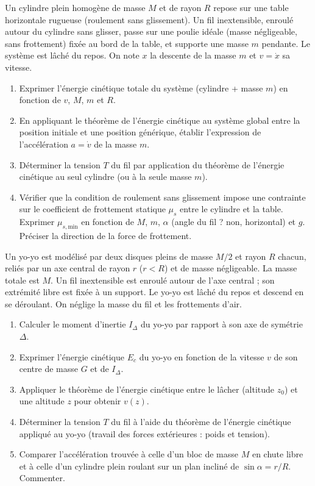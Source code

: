 \documentclass[11pt]{article}
\begin{document}
\begin{exercice}
Un cylindre plein homogène de masse $M$ et de rayon $R$ repose sur une table horizontale rugueuse (roulement sans glissement). Un fil inextensible, enroulé autour du cylindre sans glisser, passe sur une poulie idéale (masse négligeable, sans frottement) fixée au bord de la table, et supporte une masse $m$ pendante. Le système est lâché du repos. On note $x$ la descente de la masse $m$ et $v = \dot{x}$ sa vitesse.
\begin{enumerate}
    \item Exprimer l'énergie cinétique totale du système (cylindre + masse $m$) en fonction de $v$, $M$, $m$ et $R$.
    \item En appliquant le théorème de l'énergie cinétique au système global entre la position initiale et une position générique, établir l'expression de l'accélération $a = \dot{v}$ de la masse $m$.
    \item Déterminer la tension $T$ du fil par application du théorème de l'énergie cinétique au seul cylindre (ou à la seule masse $m$).
    \item Vérifier que la condition de roulement sans glissement impose une contrainte sur le coefficient de frottement statique $\mu_s$ entre le cylindre et la table. Exprimer $\mu_{s,\text{min}}$ en fonction de $M$, $m$, $\alpha$ (angle du fil ? non, horizontal) et $g$. Préciser la direction de la force de frottement.
\end{enumerate}
\end{exercice}

\begin{exercice}
Un yo-yo est modélisé par deux disques pleins de masse $M/2$ et rayon $R$ chacun, reliés par un axe central de rayon $r$ ($r < R$) et de masse négligeable. La masse totale est $M$. Un fil inextensible est enroulé autour de l'axe central ; son extrémité libre est fixée à un support. Le yo-yo est lâché du repos et descend en se déroulant. On néglige la masse du fil et les frottements d'air.
\begin{enumerate}
    \item Calculer le moment d'inertie $I_{\Delta}$ du yo-yo par rapport à son axe de symétrie $\Delta$.
    \item Exprimer l'énergie cinétique $E_c$ du yo-yo en fonction de la vitesse $v$ de son centre de masse $G$ et de $I_{\Delta}$.
    \item Appliquer le théorème de l'énergie cinétique entre le lâcher (altitude $z_0$) et une altitude $z$ pour obtenir $v(z)$.
    \item Déterminer la tension $T$ du fil à l'aide du théorème de l'énergie cinétique appliqué au yo-yo (travail des forces extérieures : poids et tension).
    \item Comparer l'accélération trouvée à celle d'un bloc de masse $M$ en chute libre et à celle d'un cylindre plein roulant sur un plan incliné de $\sin\alpha = r/R$. Commenter.
\end{enumerate}
\end{exercice}
\end{document}
